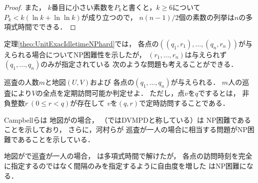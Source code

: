 \begin{proof}
  また，
  $k$番目に小さい素数を$P_k$と書くと，$k \geq 6$について
  $P_k < k( \ln k + \ln\ln k )$が成り立つ\cite{dusart1999k}ので，
  $n(n - 1)/2$個の素数の列挙は$n$の多項式時間でできる．
\end{proof}




定理\ref{theo:UnitExacIdletimeNPhard}では，
各点の{\exactTime}$((q_1, r_1), \ldots, (q_n, r_n))$が与えられる場合についてNP困難性を示したが，
$(r_1, \ldots, r_n)$は与えられず$(q_1, \ldots, q_n)$のみが指定されている
次のような問題も考えることができる．

\begin{intervalSpecifiedPatrollingProblemDecision}
  巡査の人数$m$と地図$(U, V)$および
  各点の{\exactInterval}$(q_1, \ldots, q_n)$が与えられる．
  $m$人の巡査により$V$の全点を定期訪問可能か判定せよ．
  ただし，点$v$を$q$でするとは，
  非負整数$r\ (0 \leq r < q)$が存在して
  $v$を{\exactTime}$(q, r)$で定時訪問することである．
\end{intervalSpecifiedPatrollingProblemDecision}

Campbellら\cite{campbell2005vehicle}は
地図が{\graphUnit}の場合，
{\intervalSpecifiedPatProbDecision}（\cite{campbell2005vehicle}ではDVMPDと称している）は
NP困難であることを示しており\cite[Theorem 4]{campbell2005vehicle}，
さらに，河村らが
巡査が一人の場合に相当する問題がNP困難であることを示している\cite[Theorem 20]{kawamura2015simple}．

地図が{\graphUnit}で巡査が一人の場合，
{\timeSpecifiedPatProbDecision}は多項式時間で解けたが，
各点の訪問時刻を完全に指定するのではなく間隔のみを指定するように自由度を増した
{\intervalSpecifiedPatProbDecision}はNP困難になる．





